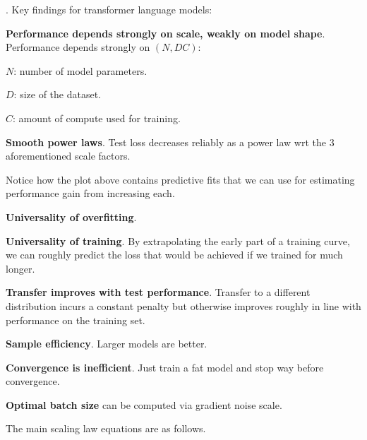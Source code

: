 \documentclass[11pt]{article}
\begin{document}
. Key findings for transformer language models:
\begin{compactitem}
	\item \textbf{Performance depends strongly on scale, weakly on model shape}. Performance depends strongly on $(N, D  C)$:
	\begin{compactitem}
		\item $N$: number of model parameters.
		\item $D$: size of the dataset.
		\item $C$: amount of compute used for training.
	\end{compactitem}
	
	\item \textbf{Smooth power laws}. Test loss decreases reliably as a power law wrt the 3 aforementioned scale factors. 
	
	
	Notice how the plot above contains predictive fits that we can use for estimating performance gain from increasing each. 
	
	\item \textbf{Universality of overfitting}. 
	
	\item \textbf{Universality of training}. By extrapolating the early part of a training curve, we can roughly predict the loss that would be achieved if we trained for much longer. 
	
	\item \textbf{Transfer improves with test performance}. Transfer to a different distribution incurs a constant penalty but otherwise improves roughly in line with performance on the training set.
	
	\item \textbf{Sample efficiency}. Larger models are better.
	
	\item \textbf{Convergence is inefficient}. Just train a fat model and stop way before convergence. 
	
	\item \textbf{Optimal batch size} can be computed via gradient noise scale. 
\end{compactitem}

The main scaling law equations are as follows.
\end{document}
